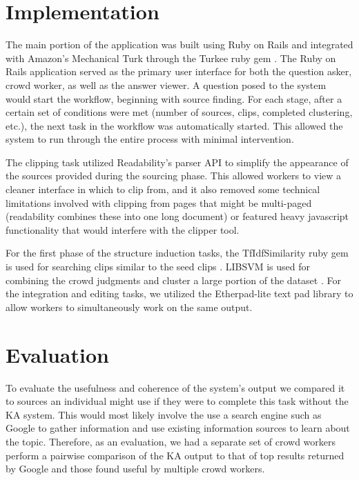\section{Implementation}

The main portion of the application was built using Ruby on Rails and integrated with Amazon's Mechanical Turk through the Turkee ruby gem \cite{turkee}. The Ruby on Rails application served as the primary user interface for both the question asker, crowd worker, as well as the answer viewer. A question posed to the system would start the workflow, beginning with source finding. For each stage, after a certain set of conditions were met (number of sources, clips, completed clustering, etc.), the next task in the workflow was automatically started. This allowed the system to run through the entire process with minimal intervention. 

The clipping task utilized Readability's parser API to simplify the appearance of the sources provided during the sourcing phase. This allowed workers to view a cleaner interface in which to clip from, and it also removed some technical limitations involved with clipping from pages that might be multi-paged (readability combines these into one long document) or featured heavy javascript functionality that would interfere with the clipper tool. 

For the first phase of the structure induction tasks, the TfIdfSimilarity ruby gem is used for searching clips similar to the seed clips \cite{rubytfidf}. LIBSVM is used for combining the crowd judgments and cluster a large portion of the dataset \cite{chang2011libsvm}. For the integration and editing tasks, we utilized the Etherpad-lite text pad library \cite{Etherpad} to allow workers to simultaneously work on the same output.

\section{Evaluation}

To evaluate the usefulness and coherence of the system's output we compared it to sources an individual might use if they were to complete this task without the KA system. This would most likely involve the use a search engine such as Google to gather information and use existing information sources to learn about the topic. Therefore, as an evaluation, we had a separate set of crowd workers perform a pairwise comparison of the KA output to that of top results returned by Google and those found useful by multiple crowd workers.

